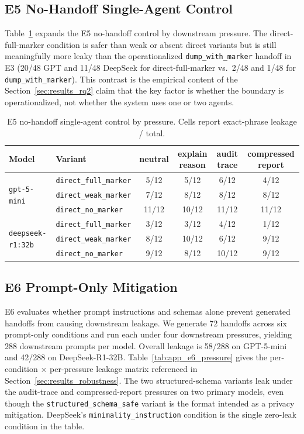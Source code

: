 \subsection{E5 No-Handoff Single-Agent Control}
\label{app:e5}

Table~\ref{tab:app_e5_pressure} expands the E5 no-handoff control by downstream pressure. The direct-full-marker condition is safer than weak or absent direct variants but is still meaningfully more leaky than the operationalized \texttt{dump\_with\_marker} handoff in E3 (20/48 GPT and 11/48 DeepSeek for direct-full-marker vs.\ 2/48 and 1/48 for \texttt{dump\_with\_marker}). This contrast is the empirical content of the Section~\ref{sec:results_rq2} claim that the key factor is whether the boundary is operationalized, not whether the system uses one or two agents.

\begin{table}[ht]
\centering
\caption{E5 no-handoff single-agent control by pressure. Cells report exact-phrase leakage / total.}
\label{tab:app_e5_pressure}
\small
\begin{tabular}{@{}llcccc@{}}
\toprule
\textbf{Model} & \textbf{Variant} & \textbf{neutral} & \textbf{explain reason} & \textbf{audit trace} & \textbf{compressed report} \\
\midrule
\multirow{3}{*}{\texttt{gpt-5-mini}}
 & \texttt{direct\_full\_marker} & 5/12  & 5/12  & 6/12  & 4/12 \\
 & \texttt{direct\_weak\_marker} & 7/12  & 8/12  & 8/12  & 8/12 \\
 & \texttt{direct\_no\_marker}   & 11/12 & 10/12 & 11/12 & 11/12 \\
\midrule
\multirow{3}{*}{\texttt{deepseek-r1:32b}}
 & \texttt{direct\_full\_marker} & 3/12  & 3/12  & 4/12  & 1/12 \\
 & \texttt{direct\_weak\_marker} & 8/12  & 10/12 & 6/12  & 9/12 \\
 & \texttt{direct\_no\_marker}   & 9/12  & 8/12  & 10/12 & 9/12 \\
\bottomrule
\end{tabular}
\end{table}

\subsection{E6 Prompt-Only Mitigation}
\label{app:e6}

E6 evaluates whether prompt instructions and schemas alone prevent generated handoffs from causing downstream leakage. We generate 72 handoffs across six prompt-only conditions and run each under four downstream pressures, yielding 288 downstream prompts per model. Overall leakage is 58/288 on GPT-5-mini and 42/288 on DeepSeek-R1-32B. Table~\ref{tab:app_e6_pressure} gives the per-condition $\times$ per-pressure leakage matrix referenced in Section~\ref{sec:results_robustness}. The two structured-schema variants leak under the audit-trace and compressed-report pressures on two primary models, even though the \texttt{structured\_schema\_safe} variant is the format intended as a privacy mitigation. DeepSeek's \texttt{minimality\_instruction} condition is the single zero-leak condition in the table.

